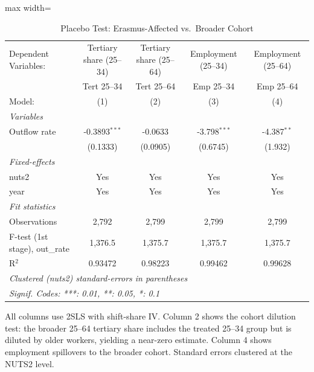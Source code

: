\begin{table}[htbp]
   \caption{\label{tab:placebo} Placebo Test: Erasmus-Affected vs.\ Broader Cohort}
   \centering
   \scriptsize
   \begin{adjustbox}{max width=\textwidth}
   \begin{tabular}{lcccc}
      \tabularnewline \midrule \midrule
      Dependent Variables:           & Tertiary share (25--34) & Tertiary share (25--64) & Employment (25--34) & Employment (25--64)\\  
                                     & Tert 25--34             & Tert 25--64             & Emp 25--34          & Emp 25--64 \\   
      Model:                         & (1)                     & (2)                     & (3)                 & (4)\\  
      \midrule
      \emph{Variables}\\
      Outflow rate                   & -0.3893$^{***}$         & -0.0633                 & -3.798$^{***}$      & -4.387$^{**}$\\   
                                     & (0.1333)                & (0.0905)                & (0.6745)            & (1.932)\\   
      \midrule
      \emph{Fixed-effects}\\
      nuts2                          & Yes                     & Yes                     & Yes                 & Yes\\  
      year                           & Yes                     & Yes                     & Yes                 & Yes\\  
      \midrule
      \emph{Fit statistics}\\
      Observations                   & 2,792                   & 2,799                   & 2,799               & 2,799\\  
      F-test (1st stage), out\_rate  & 1,376.5                 & 1,375.7                 & 1,375.7             & 1,375.7\\  
      R$^2$                          & 0.93472                 & 0.98223                 & 0.99462             & 0.99628\\  
      \midrule \midrule
      \multicolumn{5}{l}{\emph{Clustered (nuts2) standard-errors in parentheses}}\\
      \multicolumn{5}{l}{\emph{Signif. Codes: ***: 0.01, **: 0.05, *: 0.1}}\\
   \end{tabular}
   \end{adjustbox}
   
   \par \raggedright 
   All columns use 2SLS with shift-share IV. Column 2 shows the cohort dilution test: the broader 25--64 tertiary share includes the treated 25--34 group but is diluted by older workers, yielding a near-zero estimate. Column 4 shows employment spillovers to the broader cohort. Standard errors clustered at the NUTS2 level.
\end{table}
